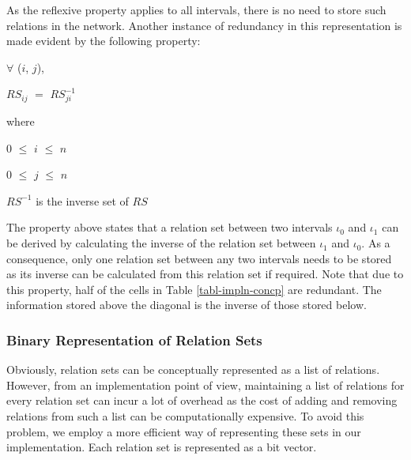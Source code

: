 \documentclass[11pt]{report}
\newenvironment{vquote}
{
  \begin{list}{}{\leftmargin 1em}\item[]
}
{
  \end{list}
}
\begin{document}
        As the reflexive property applies to all intervals, there is no need to
        store such relations in the network. Another instance of redundancy in
        this representation is made evident by the following property:

        \begin{vquote}
          $\forall$ ($i$, $j$),

          $RS_{ij}$ $=$ $RS^{-1}_{ji}$

          where

          \hspace{1em}
          $0$ $\leq$ $i$ $\leq$ $n$

          \hspace{1em}
          $0$ $\leq$ $j$ $\leq$ $n$

          \hspace{1em}
          $RS^{-1}$ is the inverse set of $RS$
        \end{vquote}

        The property above states that a relation set between two intervals
        $\iota_0$ and $\iota_1$ can be derived by calculating the inverse of
        the relation set between $\iota_1$ and $\iota_0$. As a consequence,
        only one relation set between any two intervals needs to be stored
        as its inverse can be calculated from this relation set if required.
        Note that due to this property, half of the cells in Table
        \ref{tabl-impln-concp} are redundant. The information stored above the
        diagonal is the inverse of those stored below.

        \subsubsection{Binary Representation of Relation Sets}

          Obviously, relation sets can be conceptually represented as a list of
          relations. However, from an implementation point of view, maintaining
          a list of relations for every relation set can incur a lot of
          overhead as the cost of adding and removing relations from such a
          list can be computationally expensive. To avoid this problem, we
          employ a more efficient way of representing these sets in our
          implementation. Each relation set is represented as a bit
          vector\footnotemark.

\end{document}
